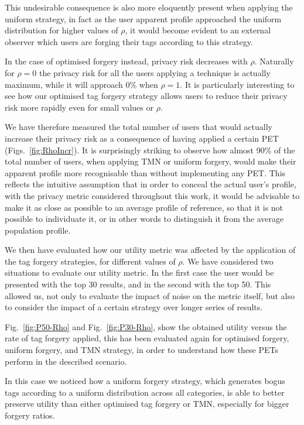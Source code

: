 This undesirable consequence is also more eloquently present when applying the uniform strategy, in fact as the user apparent profile approached the uniform distribution for higher values of $\rho$, it would become evident to an external observer which users are forging their tags according to this strategy.

In the case of optimised forgery instead, privacy risk decreases with $\rho$. Naturally for $\rho = 0$ the privacy risk for all the users applying a technique is actually maximum, while it will approach 0\% when $\rho = 1 $. It is particularly interesting to see how our optimised tag forgery strategy allows users to reduce their privacy risk  more rapidly even for small values or $ \rho $.

We have therefore measured the total number of users that would actually increase their privacy risk as a consequence of having applied a certain PET (Figs.~\ref{fig:RhoIncr}). It is surprisingly striking to observe how almost 90\% of the total number of users, when applying TMN or uniform forgery, would make their apparent profile more recognisable than without implementing any PET.
This reflects the intuitive assumption that in order to conceal the actual user's profile, with the privacy metric considered throughout this work, it would be advisable to make it as close as possible to an average profile of reference, so that it is not possible to individuate it, or in other words to distinguish it from the average population profile.

We then have evaluated how our utility metric was affected by the application of the tag forgery strategies, for different values of $\rho$. We have considered two situations to evaluate our utility metric. In the first case the user would be presented with the top 30 results, and in the second with the top 50. This allowed us, not only to evaluate the impact of noise on the metric itself, but also to consider the impact of a certain strategy over longer series of results.

Fig.~\ref{fig:P50-Rho} and Fig.~\ref{fig:P30-Rho}, show the obtained utility versus the rate of tag forgery applied, this has been evaluated again for optimised forgery, uniform forgery, and TMN strategy, in order to understand how these PETs perform in the described scenario.

In this case we noticed how a uniform forgery strategy, which generates bogus tags according to a uniform distribution across all categories, is able to better preserve utility than either optimised tag forgery or TMN, especially for bigger forgery ratios.

